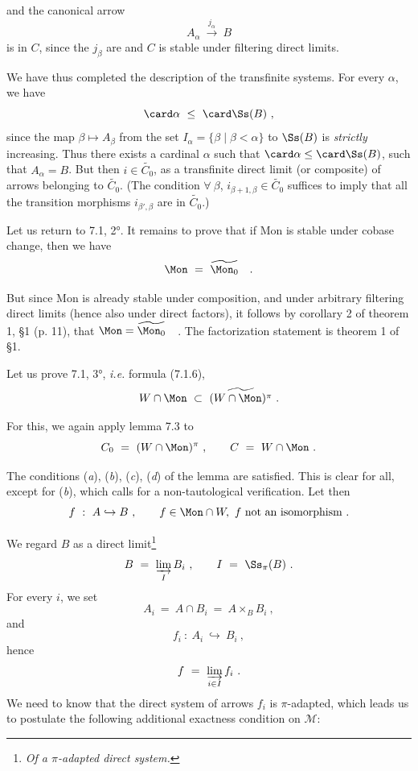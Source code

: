 
and the canonical arrow
\[
A_\alpha \ \xrightarrow{j_\alpha} \ B
\]
is in $C$, since the $j_\beta$ are and $C$ is stable under filtering direct limits.

We have thus completed the description of the transfinite systems. For every $\alpha$, we have
\[
\card \alpha \ \leq \ \card \Ss(B) \ ,
\]
since the map $\beta \longmapsto A_\beta$ from the set $I_\alpha = \{\beta \mid \beta < \alpha\}$ to $\Ss(B)$ is \textit{strictly} increasing. Thus there exists a cardinal $\alpha$ such that $\card \alpha \leq \card \Ss(B)$, such that $A_\alpha = B$. But then $i \in \widetilde{C_0}$, as a transfinite direct limit (or composite) of arrows belonging to $\widetilde{C_0}$. (The condition $\forall\ \beta$, $i_{\beta+1,\beta} \in \widetilde{C_0}$ suffices to imply that all the transition morphisms $i_{\beta',\beta}$ are in $\widetilde{C_0}$.)

Let us return to 7.1, 2°. It remains to prove that if Mon is stable under cobase change, then we have
\[
\Mon \ = \ \widetilde{\Mon_0} \quad .
\]

But since Mon is already stable under composition, and under arbitrary filtering direct limits (hence also under direct factors), it follows by corollary 2 of theorem 1, §1 (p. 11), that $\Mon = \widetilde{\Mon_0}$\ \ . The factorization statement is theorem 1 of §1.



Let us prove 7.1, 3°, \textit{i.e.} formula (7.1.6),
\[
W \cap \Mon \ \subset \ \widetilde{(W \cap \Mon)^{\pi}} \ .
\]

For this, we again apply lemma 7.3 to
\[
C_0 \ = \ (W \cap \Mon)^{\pi} \ , \qquad C \ = \ W \cap \Mon \ .
\]

The conditions (\textit{a}), (\textit{b}), (\textit{c}), (\textit{d}) of the lemma are satisfied. This is clear for all, except for (\textit{b}), which calls for a non-tautological verification. Let then
\[
f \ : \ A \hookrightarrow B \ , \qquad f \in \Mon \cap W,\ f \text{ not an isomorphism} \ .
\]

We regard $B$ as a direct limit\footnote[33]{\textit{Of a $\pi$-adapted direct system.}}
\[
B \ = \ \varinjlim_{I} B_i \ , \qquad I \ = \ \Ss_{\pi}(B) \ .
\]
For every $i$, we set
\[
A_i \ = \ A \cap B_i \ = \ A \times_B B_i \ ,
\]
and
\[
f_i \ : \ A_i \ \hookrightarrow \ B_i \ ,
\]
hence
\[
f \ = \ \varinjlim_{i \in I} f_i \ .
\]
We need to know that the direct system of arrows $f_i$ is $\pi$-adapted, which leads us to postulate the following additional exactness condition on $\mathcal{M}$:

